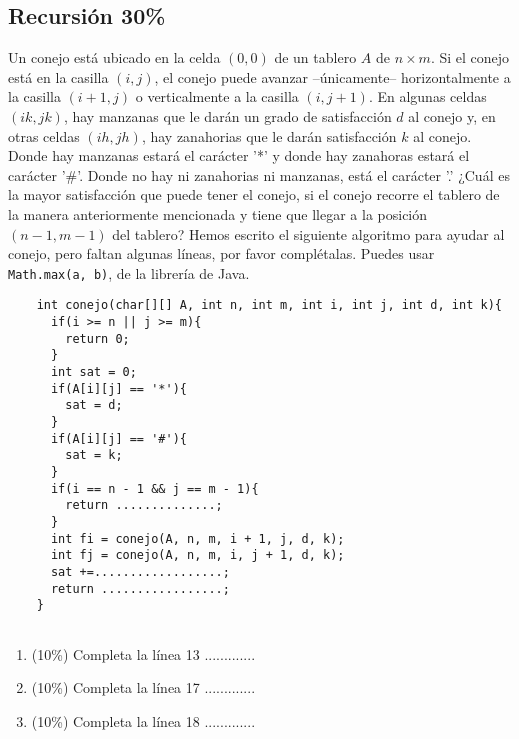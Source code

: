 \documentclass[10 pt]{article}
\begin{document}
\begin{multicols}{2}
\section{Recursión 30\%}
	Un conejo está ubicado en la celda $(0, 0)$ de un tablero $A$  de $n \times m$. Si el conejo está en la casilla $(i, j)$, el conejo puede avanzar --únicamente-- horizontalmente a la casilla $(i + 1, j)$ o verticalmente a la casilla $(i, j + 1)$. En algunas celdas $(ik, jk)$, hay manzanas que le darán un grado de satisfacción $d$ al conejo y, en otras celdas $(ih, jh)$, hay zanahorias que le darán satisfacción $k$ al conejo. Donde hay manzanas estará el carácter '*' y donde hay zanahoras estará el carácter '\#'.  Donde no hay ni zanahorias ni manzanas, está el carácter '.' ¿Cuál es la mayor satisfacción que puede tener el conejo, si el conejo recorre el tablero de la manera anteriormente mencionada y tiene que llegar a la posición $(n - 1, m - 1)$ del tablero? Hemos escrito el siguiente algoritmo para ayudar al conejo, pero faltan algunas líneas, por favor complétalas. Puedes usar \texttt{Math.max(a, b)}, de la librería de Java.
	\begin{lstlisting}
	int conejo(char[][] A, int n, int m, int i, int j, int d, int k){
	  if(i >= n || j >= m){
	    return 0;
	  }
	  int sat = 0;
	  if(A[i][j] == '*'){
	    sat = d; 
	  }
      if(A[i][j] == '#'){
	    sat = k; 
	  }
	  if(i == n - 1 && j == m - 1){
	    return ..............;
	  }
	  int fi = conejo(A, n, m, i + 1, j, d, k);
	  int fj = conejo(A, n, m, i, j + 1, d, k);
	  sat +=..................;
	  return .................;
	}
	
	\end{lstlisting}
	\begin{enumerate}[label=\alph*)]
		\item (10\%) Completa la línea 13 .............
		\item (10\%) Completa la línea 17 .............
		\item (10\%) Completa la línea 18 .............
	\end{enumerate}



\end{multicols}
\end{document}
